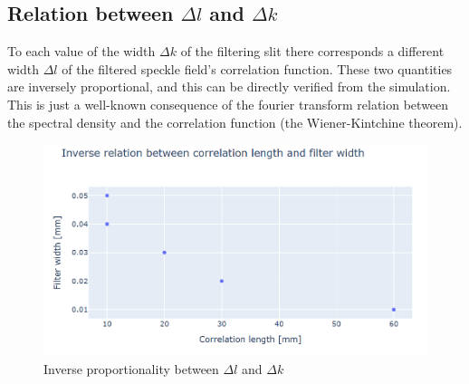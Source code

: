 \subsection{Relation between \texorpdfstring{$\Delta l$}{dl} and \texorpdfstring{$\Delta k$}{dk}}

To each value of the width $\Delta k$ of the filtering slit there corresponds a different width $\Delta l$  of the filtered speckle field's correlation function. 
These two quantities are inversely proportional, and this can be directly verified from the simulation. This is just a well-known consequence of the fourier transform 
relation between the spectral density and the correlation function (the Wiener-Kintchine theorem).

\begin{figure}[!ht]
    \centering
    \includegraphics[width = \textwidth]{Img/inv.png}
    \caption{Inverse proportionality between $\Delta l$ and $\Delta k$}
    \label{inv}
\end{figure}